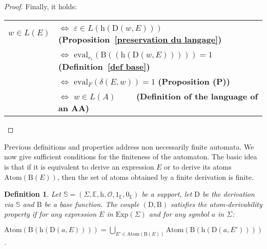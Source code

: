 \documentclass{article}
\newtheorem{definition}{Definition}
\begin{document}
\begin{proof}
        Finally, it holds:
        
          \begin{tabular}{l@{\ }l}
            $w\in L(E)$ & $\Leftrightarrow$ $\varepsilon\in L(\mathrm{h}(\mathrm{D}(w,E)))$ \hfill\textbf{(Proposition~\ref{preservation du langage})}\\
            & $\Leftrightarrow$ $\mathrm{eval}_{r_{\varepsilon}}(\mathrm{B}((\mathrm{h}(\mathrm{D}(w,E)))))=1$ \hfill\textbf{(Definition~\ref{def base})}\\
            & $\Leftrightarrow$ $\mathrm{eval}_{F}(\delta(E,w))=1$ \hfill\textbf{(Proposition \textbf{(P)})}\\
            & $\Leftrightarrow$ $w\in L(A)$\ \ \ \ \ \hfill\textbf{(Definition of the language of an AA)}\\
          \end{tabular}
          
    
\end{proof}
  

  Previous definitions and properties address non necessarily finite automata. We now give sufficient conditions for the finiteness of the automaton.
The basic idea is that if it is equivalent to derive an expression $E$ or to derive its atoms $\mathrm{Atom}(\mathrm{B}(E))$, then the set of atoms obtained by a finite derivation is finite. 
  
  \begin{definition}
    Let $\mathbb{S}=(\Sigma,\mathbb{E},\mathrm{h},\mathcal{O},1_\mathbb{E},0_\mathbb{E})$ be a support, let $\mathrm{D}$ be the derivation \emph{via} $\mathbb{S}$ and $\mathrm{B}$ be a base function. The couple $(\mathrm{D},\mathrm{B})$ satisfies the \emph{atom-derivability property} if for any expression $E$ in $\mathrm{Exp}(\Sigma)$ and for any symbol $a$ in $\Sigma$:
    
    \centerline{
      $\mathrm{Atom}(\mathrm{B}(\mathrm{h}(\mathrm{D}(a,E))))=\bigcup_{E'\in\mathrm{Atom}(\mathrm{B}(E))} \mathrm{Atom}(\mathrm{B}(\mathrm{h}(\mathrm{D}(a,E'))))$.
    }
  \end{definition}
  
\end{document}
